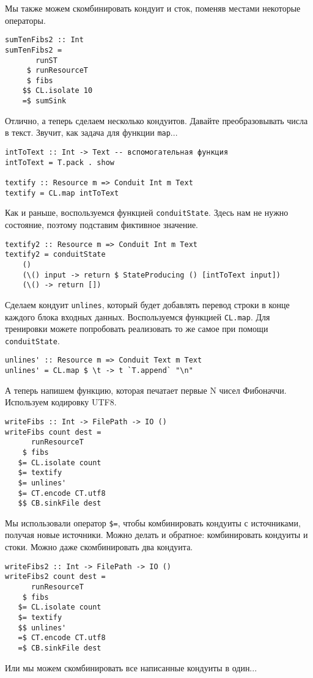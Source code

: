 Мы также можем скомбинировать кондуит и сток, поменяв местами некоторые операторы.
\begin{lstlisting}
sumTenFibs2 :: Int
sumTenFibs2 =
       runST
     $ runResourceT
     $ fibs
    $$ CL.isolate 10
    =$ sumSink
\end{lstlisting}
Отлично, а теперь сделаем несколько кондуитов. Давайте преобразовывать числа в текст.
Звучит, как задача для функции \lstinline=map=...
\begin{lstlisting}
intToText :: Int -> Text -- вспомогательная функция 
intToText = T.pack . show

textify :: Resource m => Conduit Int m Text
textify = CL.map intToText
\end{lstlisting}
Как и раньше, воспользуемся функцией \lstinline=conduitState=. Здесь
нам не нужно состояние, поэтому подставим фиктивное значение.
\begin{lstlisting}
textify2 :: Resource m => Conduit Int m Text
textify2 = conduitState
    ()
    (\() input -> return $ StateProducing () [intToText input])
    (\() -> return [])
\end{lstlisting}
Сделаем кондуит \lstinline=unlines=, который будет добавлять перевод строки в конце каждого блока
входных данных. Воспользуемся функцией \lstinline=CL.map=. Для тренировки можете попробовать реализовать то же самое при помощи \lstinline{conduitState}.
\begin{lstlisting}
unlines' :: Resource m => Conduit Text m Text
unlines' = CL.map $ \t -> t `T.append` "\n"
\end{lstlisting}
А теперь напишем функцию, которая печатает первые N чисел Фибоначчи. Используем
кодировку UTF8.
\begin{lstlisting}
writeFibs :: Int -> FilePath -> IO ()
writeFibs count dest =
      runResourceT
    $ fibs
   $= CL.isolate count
   $= textify
   $= unlines'
   $= CT.encode CT.utf8
   $$ CB.sinkFile dest
\end{lstlisting}
Мы использовали оператор \lstinline'$=', чтобы комбинировать кондуиты с источниками,
получая
новые источники. Можно делать и обратное: комбинировать кондуиты и стоки. Можно даже
скомбинировать два кондуита.
\begin{lstlisting}
writeFibs2 :: Int -> FilePath -> IO ()
writeFibs2 count dest =
      runResourceT
    $ fibs
   $= CL.isolate count
   $= textify
   $$ unlines'
   =$ CT.encode CT.utf8
   =$ CB.sinkFile dest
\end{lstlisting}
Или мы можем скомбинировать все написанные кондуиты в один...
